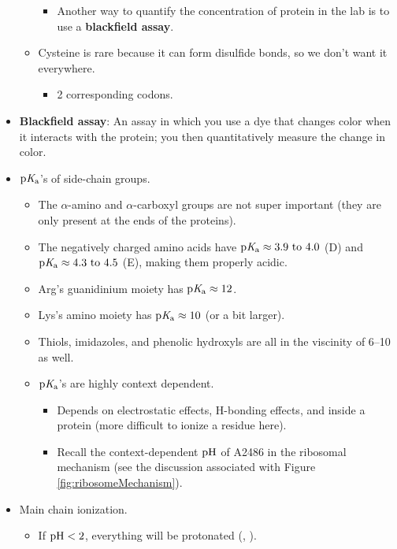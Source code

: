 \documentclass[../notes.tex]{subfiles}
\begin{document}
\begin{itemize}
\begin{itemize}
        \begin{itemize}
            \item Another way to quantify the concentration of protein in the lab is to use a \textbf{blackfield assay}.
        \end{itemize}
        \item Cysteine is rare because it can form disulfide bonds, so we don't want it everywhere.
        \begin{itemize}
            \item 2 corresponding codons.
        \end{itemize}
    \end{itemize}
    \item \textbf{Blackfield assay}: An assay in which you use a dye that changes color when it interacts with the protein; you then quantitatively measure the change in color.
    \item $\operatorname{p\textit{K}_a}$'s of side-chain groups.
    \begin{itemize}
        \item The $\alpha$-amino and $\alpha$-carboxyl groups are not super important (they are only present at the ends of the proteins).
        \item The negatively charged amino acids have $\pKa\approx\numrange{3.9}{4.0}$ (D) and $\pKa\approx\numrange{4.3}{4.5}$ (E), making them properly acidic.
        \item Arg's guanidinium moiety has $\operatorname{p\textit{K}_a}\approx 12$.
        \item Lys's amino moiety has $\operatorname{p\textit{K}_a}\approx 10$ (or a bit larger).
        \item Thiols, imidazoles, and phenolic hydroxyls are all in the viscinity of \numrange{6}{10} as well.
        \item $\operatorname{p\textit{K}_a}$'s are highly context dependent.
        \begin{itemize}
            \item Depends on electrostatic effects, H-bonding effects, and inside a protein (more difficult to ionize a residue here).
            \item Recall the context-dependent $\operatorname{pH}$ of A2486 in the ribosomal mechanism (see the discussion associated with Figure \ref{fig:ribosomeMechanism}).
        \end{itemize}
    \end{itemize}
    \item Main chain ionization.
    \begin{itemize}
        \item If $\operatorname{pH}<2$, everything will be protonated (, ).

\end{itemize}
\end{itemize}
\end{document}
